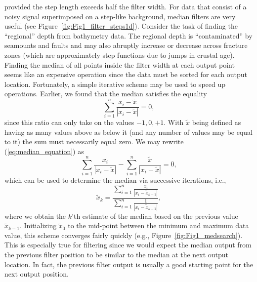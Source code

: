 provided the step length exceeds half the filter width.
For data that consist of a noisy signal superimposed on a step-like background, median
filters are very useful  (see Figure~\ref{fig:Fig1_filter_steps1d}). Consider the task of finding the ``regional'' depth from
bathymetry data. The regional depth is ``contaminated'' by seamounts and faults and
may also abruptly increase or decrease across fracture zones (which are approximately step functions due to jumps in
crustal age).
	Finding the median of all points inside the filter width at each output point seems like
an expensive operation since the data must be sorted for each output location. Fortunately, a simple
iterative scheme may be used to speed up operations. Earlier, we found that the median satisfies the equality
\begin{equation}
\sum^n _{i=1} \frac{x_i - \tilde{x}}{|x_i - \tilde{x}|} = 0,
\label{eq:median_equation}
\end{equation}
since this ratio can only take on the values $-1, 0, +1$. With $\tilde{x}$ being defined as having as many values
above as below it (and any number of values may be equal to it) the sum must necessarily equal zero.
We may rewrite (\ref{eq:median_equation}) as
$$
\sum^n _{i=1} \frac{x_i}{|x_i - \tilde{x}|} -
\sum^n _{i=1} \frac{\tilde{x}} {|x_i - \tilde{x}|} = 0,
$$
which can be used to determine the median via successive iterations, i.e.,
\begin{equation}
\tilde{x}_k = \frac{\displaystyle \sum^n _{i=1} \frac{x_i}{|x_i - \tilde{x}_{k-1}|} } {\displaystyle \sum^n _{i=1} \frac{1}{|x_i - \tilde{x}_{k-1}|} },
\label{eq:median_iteration}
\end{equation}
where we obtain the $k$'th estimate of the median based on the previous value $\tilde{x}_{k-1}$.  Initializing $\tilde{x}_0$ to the mid-point between the minimum and maximum
data value, this scheme converges fairly quickly (e.g., Figure~\ref{fig:Fig1_medsearch}).  This is especially true for filtering since we would expect the median
output from the previous filter position to be similar to the median at the next output location.  In fact, the previous filter output is usually a good starting point
for the next output position.

